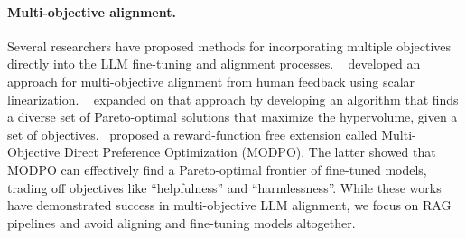 \paragraph{Multi-objective alignment.} Several researchers have proposed methods for incorporating multiple objectives directly into the LLM fine-tuning and alignment processes. ~\citet{li2020deep} developed an approach for multi-objective alignment from human feedback using scalar linearization. ~\cite{mukherjee2024multi} expanded on that approach by developing an algorithm that finds a diverse set of Pareto-optimal solutions that maximize the hypervolume, given a set of objectives.~\cite{zhou2024beyond} proposed a reward-function free extension called Multi-Objective Direct Preference Optimization (MODPO). The latter showed that MODPO can effectively find a Pareto-optimal frontier of fine-tuned models, trading off objectives like ``helpfulness'' and ``harmlessness''. While these works have demonstrated success in multi-objective LLM alignment, we focus on RAG pipelines and avoid aligning and fine-tuning models altogether. 
